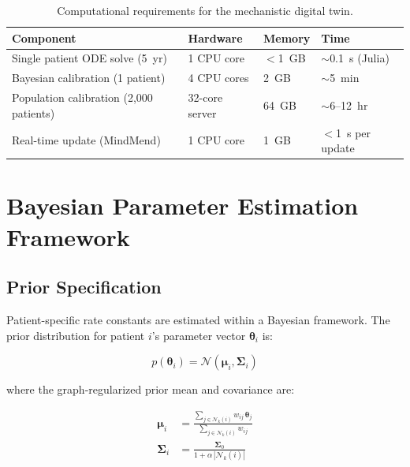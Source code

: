 \begin{table}[h]
\centering
\caption{Computational requirements for the mechanistic digital twin.}
\label{tab:compute}
\small
\begin{tabular}{llll}
\toprule
\textbf{Component} & \textbf{Hardware} & \textbf{Memory} & \textbf{Time} \\
\midrule
Single patient ODE solve (5~yr) & 1 CPU core & $<$1~GB & $\sim$0.1~s (Julia) \\
Bayesian calibration (1 patient) & 4 CPU cores & 2~GB & $\sim$5~min \\
Population calibration (2,000 patients) & 32-core server & 64~GB & $\sim$6--12~hr \\
Real-time update (MindMend) & 1 CPU core & 1~GB & $<$1~s per update \\
\bottomrule
\end{tabular}
\end{table}


\section{Bayesian Parameter Estimation Framework}
\label{sec:mech-bayesian}

\subsection{Prior Specification}

Patient-specific rate constants are estimated within a Bayesian framework. The prior distribution for patient $i$'s parameter vector $\boldsymbol{\theta}_i$ is:

\begin{equation}
p(\boldsymbol{\theta}_i) = \mathcal{N}(\boldsymbol{\mu}_i, \boldsymbol{\Sigma}_i)
\label{eq:graph-prior}
\end{equation}

where the graph-regularized prior mean and covariance are:

\begin{align}
\boldsymbol{\mu}_i &= \frac{\sum_{j \in \mathcal{N}_k(i)} w_{ij} \, \boldsymbol{\theta}_j}{\sum_{j \in \mathcal{N}_k(i)} w_{ij}} \label{eq:prior-mean} \\
\boldsymbol{\Sigma}_i &= \frac{\boldsymbol{\Sigma}_0}{1 + \alpha \, |\mathcal{N}_k(i)|} \label{eq:prior-cov}
\end{align}

